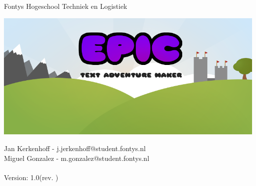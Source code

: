 
\begin{titlepage}

Fontys Hogeschool Techniek en Logistiek

\begin{center}

\vspace*{1.8in}
\includegraphics[scale=0.55]{../epic.png}
\vspace*{1.5in}

{\footnotesize
Jan Kerkenhoff - j.jerkenhoff@student.fontys.nl\\
Miguel Gonzalez - m.gonzalez@student.fontys.nl\\
\thedate\\

Version: 1.0\hspace{5pt}(rev. \svnrev)
}

\end{center}

\end{titlepage}

